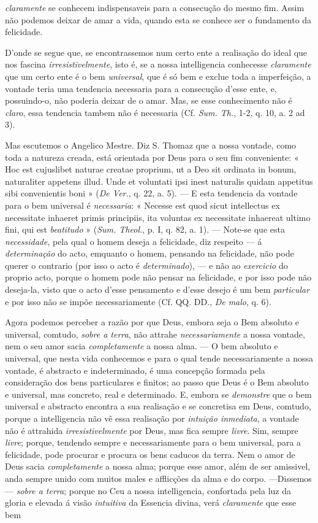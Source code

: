 \emph{claramente} se conhecem indispensaveis para a consecução do mesmo fim. Assim não podemos deixar de amar a vida, quando esta se conhece ser o fundamento da felicidade.\par D'onde se segue que, se encontrassemos num certo ente a realisação do ideal que nos fascina \emph{irresistivelmente}, isto é, se a nossa intelligencia conhecesse \emph{claramente} que um certo ente é o bem \emph{universal}, que é só bem e exclue toda a imperfeição, a vontade teria uma tendencia necessaria para a consecução d'esse ente, e, possuindo-o, não poderia deixar de o amar. Mas, se esse conhecimento não é \emph{claro}, essa tendencia tambem não é necessaria (Cf. \emph{Sum. Th.}, 1-2, q. 10, a. 2 ad 3).\par Mas escutemos o Angelico Mestre. Diz S. Thomaz que a nossa vontade, como toda a natureza creada, está orientada por Deus para o seu fim conveniente: « Hoc est cujuslibet naturae creatae proprium, ut a Deo sit ordinata in bonum, naturaliter appetens illud. Unde et voluntati ipsi inest naturalis quidam appetitus sibi convenientis boni » (\emph{De Ver.}, q. 22, a. 5). --- E esta tendencia da vontade para o bem universal é \emph{necessaria}: « Necesse est quod sicut intellectus ex necessitate inhaeret primis principiis, ita voluntas ex necessitate inhaereat ultimo fini, qui est \emph{beatitudo} » (\emph{Sum. Theol.}, p. I, q. 82, a. 1). --- Note-se que esta \emph{necessidade}, pela qual o homem deseja a felicidade, diz respeito --- á \emph{determinação} do acto, emquanto o homem, pensando na felicidade, não pode querer o contrario (por isso o acto é \emph{determinado}), --- e não ao \emph{exercicio} do proprio acto, porque o homem pode não pensar na felicidade, e por isso pode não deseja-la, visto que o acto d'esse pensamento e d'esse desejo é um bem \emph{particular} e por isso não se impõe necessariamente (Cf. QQ. DD., \emph{De malo}, q. 6).\par Agora podemos perceber a razão por que Deus, embora seja o Bem absoluto e universal, comtudo, \emph{sobre a terra}, não attrahe \emph{necessariamente} a nossa vontade, nem o seu amor sacia \emph{completamente} a nossa alma. --- O bem absoluto e universal, que nesta vida conhecemos e para o qual tende necessariamente a nossa vontade, é abstracto e indeterminado, é uma concepção formada pela consideração dos bens particulares e finitos; ao passo que Deus é o Bem absoluto e universal, mas concreto, real e determinado. E, embora se \emph{demonstre} que o bem universal e abstracto encontra a sua realisação e se concretisa em Deus, comtudo, porque a intelligencia não vê essa realisação por \emph{intuição inmediata}, a vontade não é attrahida \emph{irresistivelmente} por Deus, mas fica sempre \emph{livre}. Sim, sempre \emph{livre}; porque, tendendo sempre e necessariamente para o bem universal, para a felicidade, pode procurar e procura os bens caducos da terra. Nem o amor de Deus sacia \emph{completamente} a nossa alma; porque esse amor, além de ser amissivel, anda sempre unido com muitos males e afflicções da alma e do corpo. ---Dissemos --- \emph{sobre a terra}; porque no Ceu a nossa intelligencia, confortada pela luz da gloria e elevada á visão \emph{intuitiva} da Essencia divina, verá \emph{claramente} que esse bem 